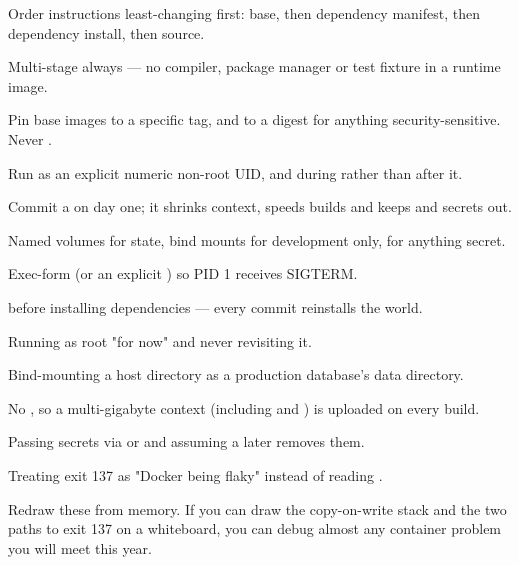 \begin{bestpractices}
\begin{wbitem}
  \item Order instructions least-changing first: base, then dependency manifest, then dependency install, then source.
  \item Multi-stage always --- no compiler, package manager or test fixture in a runtime image.
  \item Pin base images to a specific tag, and to a digest for anything security-sensitive. Never .
  \item Run as an explicit numeric non-root UID, and  during  rather than after it.
  \item Commit a  on day one; it shrinks context, speeds builds and keeps  and secrets out.
  \item Named volumes for state, bind mounts for development only,  for anything secret.
  \item Exec-form  (or an explicit ) so PID 1 receives SIGTERM.
\end{wbitem}
\end{bestpractices}
\begin{mistakes}
\begin{wbitem}
  \item {} before installing dependencies --- every commit reinstalls the world.
  \item Running as root "for now" and never revisiting it.
  \item Bind-mounting a host directory as a production database's data directory.
  \item No , so a multi-gigabyte context (including  and ) is uploaded on every build.
  \item Passing secrets via  or  and assuming a later  removes them.
  \item Treating exit 137 as "Docker being flaky" instead of reading .
\end{wbitem}
\end{mistakes}


Redraw these from memory. If you can draw the copy-on-write stack and the two paths to exit 137 on a whiteboard, you can debug almost any container problem you will meet this year.

